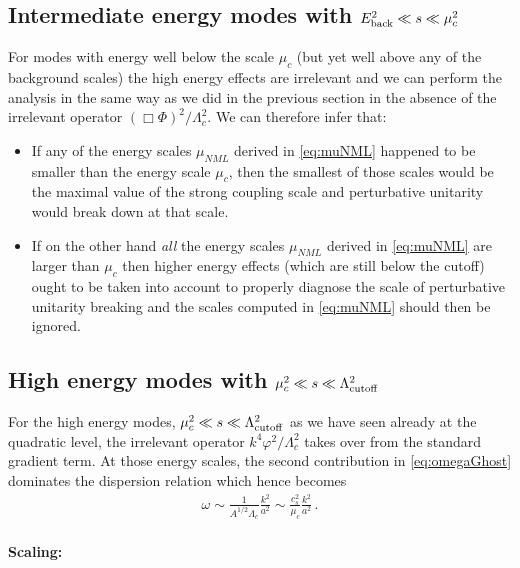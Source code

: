 \documentclass[12pt]{article}
\def\ba{\begin{eqnarray}}
\def\ea{\end{eqnarray}}
\begin{document}
\subsection{Intermediate energy modes with $E_{\rm back}^2 \ll s \ll \mu^2_c $}
\label{sec:intermediate}
For modes with energy well below the scale $\mu_c$ (but yet well above any of the background scales) the high energy effects are irrelevant and we can perform the analysis in the same way as we did in the previous section in the absence of the irrelevant operator $(\Box \Phi)^2/\Lambda_c^2$. We can therefore infer that:
 \begin{itemize}
 \item If any of the energy scales $\mu_{NML}$ derived in \eqref{eq:muNML} happened to be smaller than the energy scale $\mu_c$, then the smallest of those scales would be the maximal value of the strong coupling scale and perturbative unitarity would break down at that scale.
\item If on the other hand {\it all} the energy scales $\mu_{NML}$ derived in \eqref{eq:muNML} are larger than $\mu_c$ then higher energy effects (which are still below the cutoff) ought to be taken into account to properly diagnose the scale of perturbative unitarity breaking and the scales computed in  \eqref{eq:muNML} should then be ignored.
\end{itemize}


\subsection{High energy modes with $\mu^2_c \ll s \ll \Lambda^2_{\rm cutoff} $}
\label{sec:highenergymodes}

For the high energy modes, $\mu^2_c \ll s \ll \Lambda^2_{\rm cutoff} $ as we have seen already at the quadratic level, the irrelevant operator $k^4 \varphi^2/\Lambda_c^2$ takes over from the standard gradient term.
At those energy scales, the second contribution in \eqref{eq:omegaGhost} dominates the dispersion relation which hence becomes
\ba
\omega\sim \frac{1}{A^{1/2}\Lambda_c}\frac{k^2}{a^2}\sim \frac{c_s^2}{\mu_c }\frac{k^2}{a^2}\,.
\ea

\paragraph{Scaling:}
\end{document}
